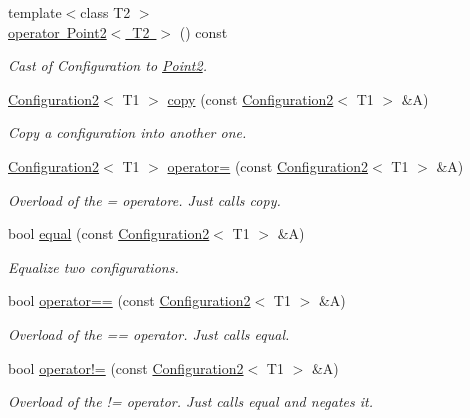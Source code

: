 \begin{DoxyCompactItemize}
{\footnotesize template$<$class T2 $>$ }\\\mbox{\hyperlink{class_configuration2_a68bfa8b94c1cff3179698e00edb2890e}{operator Point2$<$ T2 $>$}} () const
\begin{DoxyCompactList}\small\item\em Cast of Configuration to \mbox{\hyperlink{class_point2}{Point2}}. \end{DoxyCompactList}\item 
\mbox{\hyperlink{class_configuration2}{Configuration2}}$<$ T1 $>$ \mbox{\hyperlink{class_configuration2_a8b0bb9f80a69ff8d70af39adf97ceb46}{copy}} (const \mbox{\hyperlink{class_configuration2}{Configuration2}}$<$ T1 $>$ \&A)
\begin{DoxyCompactList}\small\item\em Copy a configuration into another one. \end{DoxyCompactList}\item 
\mbox{\hyperlink{class_configuration2}{Configuration2}}$<$ T1 $>$ \mbox{\hyperlink{class_configuration2_a9ef2f57ddcc1f0c8117a9ed2f13141aa}{operator=}} (const \mbox{\hyperlink{class_configuration2}{Configuration2}}$<$ T1 $>$ \&A)
\begin{DoxyCompactList}\small\item\em Overload of the = operatore. Just calls {\ttfamily copy}. \end{DoxyCompactList}\item 
bool \mbox{\hyperlink{class_configuration2_a1744207d1346e2ec554795255a58c241}{equal}} (const \mbox{\hyperlink{class_configuration2}{Configuration2}}$<$ T1 $>$ \&A)
\begin{DoxyCompactList}\small\item\em Equalize two configurations. \end{DoxyCompactList}\item 
bool \mbox{\hyperlink{class_configuration2_a7dda6b86ded2376a78a7f3d9f2811740}{operator==}} (const \mbox{\hyperlink{class_configuration2}{Configuration2}}$<$ T1 $>$ \&A)
\begin{DoxyCompactList}\small\item\em Overload of the == operator. Just calls {\ttfamily equal}. \end{DoxyCompactList}\item 
bool \mbox{\hyperlink{class_configuration2_a616d2dd99d9250eeda1bc933e7b0a2da}{operator!=}} (const \mbox{\hyperlink{class_configuration2}{Configuration2}}$<$ T1 $>$ \&A)
\begin{DoxyCompactList}\small\item\em Overload of the != operator. Just calls {\ttfamily equal} and negates it. \end{DoxyCompactList}\item 

\end{DoxyCompactItemize}
